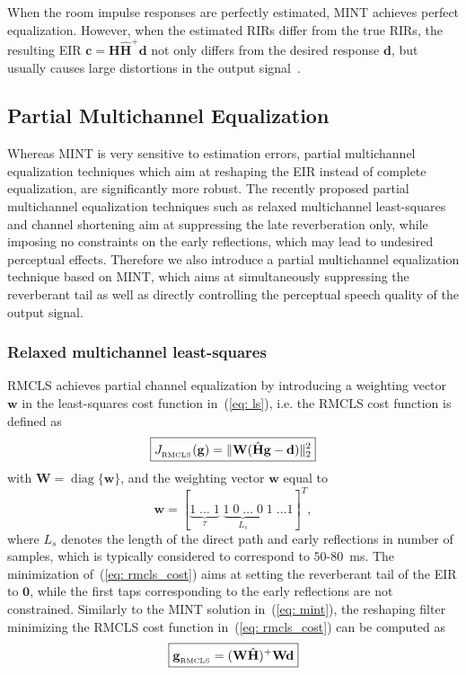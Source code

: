 \documentclass[10pt]{IEEEtran}
\DeclareMathOperator{\diag}{diag}
\begin{document}
When the room impulse responses are perfectly estimated, MINT achieves perfect equalization.
However, when the estimated RIRs differ from the true RIRs, the resulting EIR $\mathbf{c} = \mathbf{H} \hat{\mathbf{H}}^+ \mathbf{d}$ not only differs from the desired response $\mathbf{d}$, but usually causes large distortions in the output signal~\cite{Radlovic_ITSA_2000, Hikichi_EURASIP_2007}.


\subsection{Partial Multichannel Equalization}
\label{sec: partial}
Whereas MINT is very sensitive to estimation errors, partial multichannel equalization techniques which aim at reshaping the EIR instead of complete equalization, are significantly more robust.
The recently proposed partial multichannel equalization techniques such as relaxed multichannel least-squares and channel shortening aim at suppressing the late reverberation only, while imposing no constraints on the early reflections, which may lead to undesired perceptual effects.
Therefore we also introduce a partial multichannel equalization technique based on MINT, which aims at simultaneously suppressing the reverberant tail as well as directly controlling the perceptual speech quality of the output signal.

\subsubsection*{Relaxed multichannel least-squares~\cite{Zhang_IWAENC_2010}}
RMCLS achieves partial channel equalization by introducing a weighting vector $\mathbf{w}$ in the least-squares cost function in~(\ref{eq: ls}), i.e. the RMCLS cost function is defined as
\begin{equation}
\label{eq: rmcls_cost}
\boxed{J_{_{\rm RMCLS}}(\mathbf{g}) = \|\mathbf{W}(\hat{\mathbf{H}}\mathbf{g} - \mathbf{d})\|_2^2}
\end{equation}
with $\mathbf{W} = {\diag}\{\mathbf{w}\}$, and the weighting vector $\mathbf{w}$ equal to
\begin{equation}
\mathbf{w} = [\underbrace{1 \; \ldots \; 1}_{\tau} \; \underbrace{1 \; 0 \; \ldots \; 0}_{L_s} \; 1 \; \ldots 1]^{T},
\end{equation}
where $L_s$ denotes the length of the direct path and early reflections in number of samples, which is typically considered to correspond to $50$-$80$~ms. The minimization of~(\ref{eq: rmcls_cost}) aims at setting the reverberant tail of the EIR to $\mathbf{0}$, while the first taps corresponding to the early reflections are not constrained.
Similarly to the MINT solution in~(\ref{eq: mint}), the reshaping filter minimizing the RMCLS cost function in~(\ref{eq: rmcls_cost}) can be computed as
\begin{equation}
\boxed{\mathbf{g}_{{}_{\rm RMCLS}} = (\mathbf{W}\hat{\mathbf{H}})^{+}\mathbf{W}\mathbf{d}}
\end{equation}
\end{document}
